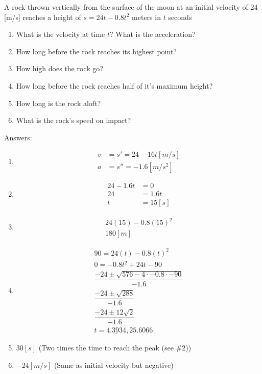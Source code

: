 \begin{example}
    A rock thrown vertically from the surface of the moon at an initial velocity of 24 [m/s] reaches a height of $s = 24t - 0.8t^2$ meters in $t$ seconds
    \begin{enumerate}
        \item What is the velocity at time $t$? What is the acceleration?
        \item How long before the rock reaches its highest point?
        \item How high does the rock go?
        \item How long before the rock reaches half of it's maximum height?
        \item How long is the rock aloft?
        \item What is the rock's speed on impact?
    \end{enumerate}
    Answers:
    \begin{enumerate}
        \item \begin{align*}
            v &= s' = 24 - 16t [m/s] \\
            a &= s'' = -1.6 [m/s^2]
        \end{align*}
        \item \begin{align*}
            24 - 1.6t &= 0 \\
            24 &= 1.6t \\
            t &= 15 [s]
        \end{align*}
        \item \begin{gather*}
            24\left(15\right) - 0.8 \left(15\right)^2 \\
            180[m]
        \end{gather*}
        \item \begin{gather*}
            90 = 24\left(t\right) - 0.8\left(t\right)^2 \\
            0 = -0.8t^2 + 24t - 90 \\
            \dfrac{-24 \pm \sqrt{576 - 4 \cdot -0.8 \cdot -90}}{-1.6} \\
            \dfrac{-24 \pm \sqrt{288}}{-1.6} \\
            \dfrac{-24 \pm 12\sqrt{2}}{-1.6} \\
            t = \underline{4.3934}, 25.6066
        \end{gather*}
        \item $30 [s]$ (Two times the time to reach the peak (see \#2))
        \item $-24 [m/s]$ (Same as initial velocity but negative)
    \end{enumerate}
\end{example}
